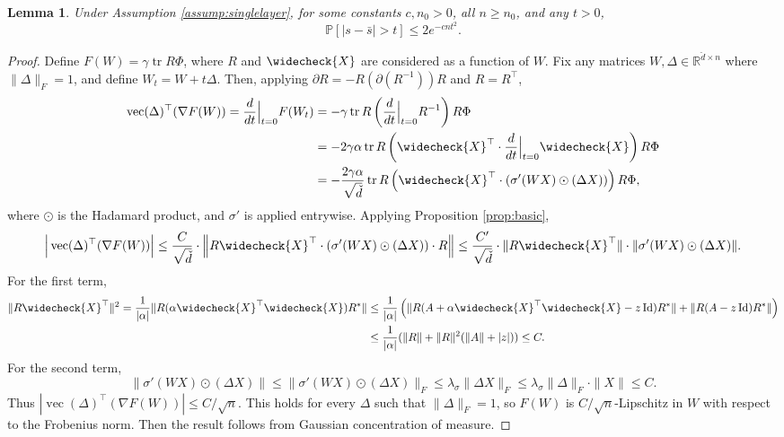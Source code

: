 \documentclass{article}
\newtheorem{lemma}[theorem]{Lemma}
\theoremstyle{definition}
\newcommand{\R}{\mathbb{R}}
\newcommand{\Id}{\operatorname{Id}}
\newcommand{\tr}{\operatorname{tr}}
\newcommand{\vd}{\check{d}}
\newcommand{\vX}{\widecheck{X}}
\renewcommand{\P}{\mathbb{P}}
\newcommand{\1}{\mathbf{1}}
\renewcommand{\vec}{\operatorname{vec}}
\begin{document}
\begin{lemma}\label{lemma:s-bars_converge}
Under Assumption \ref{assump:singlelayer},
for some constants $c,n_0>0$, all $n \geq n_0$, and any $t>0$,
\[\P\left[\left|s-\bar{s}\right|>t\right]\leq 2e^{-cnt^2}.\]
\end{lemma}
\begin{proof}
Define $F(W)=\gamma \tr R\Phi$, where $R$ and $\vX$ are considered as a
function of $W$. Fix any
matrices $W,\Delta \in \R^{\vd \times n}$ where $\|\Delta\|_F=1$, and define
$W_t=W+t \Delta$. Then, applying $\partial R=-R(\partial (R^{-1}))R$ and
$R=R^\top$,
\begin{align*}
\vec(\Delta)^\top (\nabla F(W))=\frac{d}{dt}\Big|_{t=0} F(W_t)
&=-\gamma \tr R\left(\frac{d}{dt}\Big|_{t=0}R^{-1}\right)R\Phi\\
&=-2\gamma \alpha \tr R\left(\vX^\top \cdot \frac{d}{dt}\Big|_{t=0}\vX
\right)R\Phi\\
&=-\frac{2\gamma \alpha}{\sqrt{\vd}}
\tr R\left(\vX^\top \cdot \left(\sigma'(WX) \odot
(\Delta X)\right)\right)R\Phi,
\end{align*}
where $\odot$ is the Hadamard product, and $\sigma'$ is applied entrywise.
Applying Proposition \ref{prop:basic},
\[\Big|\vec(\Delta)^\top (\nabla F(W))\Big|
\leq \frac{C}{\sqrt{\vd}} \cdot \Big\|R\vX^\top \cdot
(\sigma'(WX) \odot (\Delta X)) \cdot R\Big\|
\leq \frac{C'}{\sqrt{\vd}} \cdot \|R\vX^\top\| \cdot
\|\sigma'(WX) \odot (\Delta X)\|.\]
For the first term,
\begin{align*}
\|R\vX^\top\|^2=\frac{1}{|\alpha|}\|R(\alpha \vX^\top \vX) R^*\|
&\leq \frac{1}{|\alpha|}\left(\|R(A+\alpha \vX^\top \vX-z\Id)R^*\|
+\|R(A-z\Id)R^*\|\right)\\
& \leq \frac{1}{|\alpha|}(\|R\|+\|R\|^2(\|A\|+|z|)) \leq C.
\end{align*}
For the second term,
\[\|\sigma'(WX) \odot (\Delta X)\| \leq \|\sigma'(WX) \odot (\Delta
X)\|_F \leq \lambda_\sigma \|\Delta X\|_F \leq \lambda_\sigma \|\Delta\|_F \cdot
\|X\| \leq C.\]
Thus $|\vec(\Delta)^\top (\nabla F(W))| \leq C/\sqrt{n}$. This holds for
every $\Delta$ such that $\|\Delta\|_F=1$, so
$F(W)$ is $C/\sqrt{n}$-Lipschitz in $W$ with respect to the Frobenius norm.
Then the result follows from Gaussian concentration of measure.
\end{proof}
\end{document}
